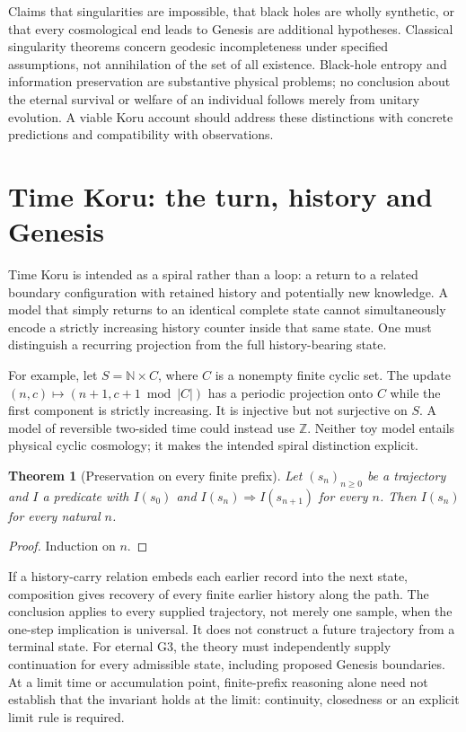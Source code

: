 \documentclass[11pt,a4paper]{article}
\newtheorem{theorem}{Theorem}[section]\newtheorem{proposition}[theorem]{Proposition}\newtheorem{definition}[theorem]{Definition}\newtheorem{example}[theorem]{Example}
\begin{document}
Claims that singularities are impossible, that black holes are wholly synthetic, or that every cosmological end leads to Genesis are additional hypotheses. Classical singularity theorems concern geodesic incompleteness under specified assumptions, not annihilation of the set of all existence. Black-hole entropy and information preservation are substantive physical problems; no conclusion about the eternal survival or welfare of an individual follows merely from unitary evolution. A viable Koru account should address these distinctions with concrete predictions and compatibility with observations.
\section{Time Koru: the turn, history and Genesis}
Time Koru is intended as a spiral rather than a loop: a return to a related boundary configuration with retained history and potentially new knowledge. A model that simply returns to an identical complete state cannot simultaneously encode a strictly increasing history counter inside that same state. One must distinguish a recurring projection from the full history-bearing state.

For example, let $S=\mathbb N\times C$, where $C$ is a nonempty finite cyclic set. The update $(n,c)\mapsto(n+1,c+1\bmod |C|)$ has a periodic projection onto $C$ while the first component is strictly increasing. It is injective but not surjective on $S$. A model of reversible two-sided time could instead use $\mathbb Z$. Neither toy model entails physical cyclic cosmology; it makes the intended spiral distinction explicit.
\begin{theorem}[Preservation on every finite prefix]\label{thm:prefix}
Let $(s_n)_{n\geq0}$ be a trajectory and $I$ a predicate with $I(s_0)$ and $I(s_n)\Rightarrow I(s_{n+1})$ for every $n$. Then $I(s_n)$ for every natural $n$.
\end{theorem}
\begin{proof} Induction on $n$.\end{proof}
If a history-carry relation embeds each earlier record into the next state, composition gives recovery of every finite earlier history along the path. The conclusion applies to every supplied trajectory, not merely one sample, when the one-step implication is universal. It does not construct a future trajectory from a terminal state. For eternal G3, the theory must independently supply continuation for every admissible state, including proposed Genesis boundaries. At a limit time or accumulation point, finite-prefix reasoning alone need not establish that the invariant holds at the limit: continuity, closedness or an explicit limit rule is required.
\end{document}
